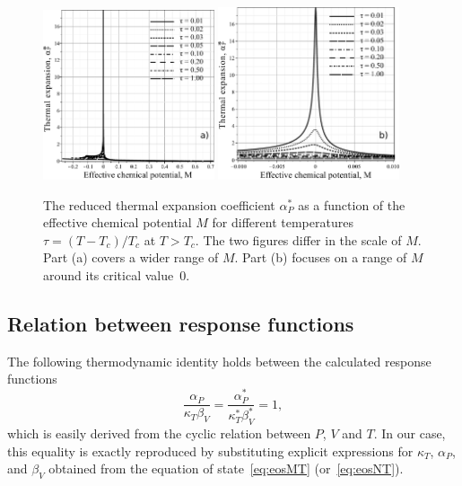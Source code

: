 \begin{figure}[h!]
	\includegraphics[width=0.45\textwidth]{f4b.pdf}
	\includegraphics[width=0.475\textwidth]{f4c.pdf}
	\vskip-3mm
	\caption{The reduced thermal expansion coefficient $\alpha^*_P$ as a function of the effective chemical potential $M$ for different temperatures $\tau = (T - T_c)/T_c$ at $T > T_c$. The two figures differ in the scale of $M$. Part (a) covers a wider range of $M$. Part (b) focuses on a range of $M$ around its critical value~$0$.
	}
	\label{fig4b}
\end{figure}

\subsection{Relation between response functions}
The following thermodynamic identity holds between the calculated response functions
\begin{equation}
	\label{eq:identity}
	\frac{\alpha_P}{\kappa_T \beta_V} = \frac{\alpha^*_P}{\kappa^*_T \beta^*_V} = 1,
\end{equation}
which is easily derived from the cyclic relation between $P$, $V$ and $T$. In our case, this equality is exactly reproduced by substituting explicit expressions for $\kappa_T$, $\alpha_P$, and $\beta_V$ obtained from the equation of state~\eqref{eq:eosMT} (or~\eqref{eq:eosNT}). 

